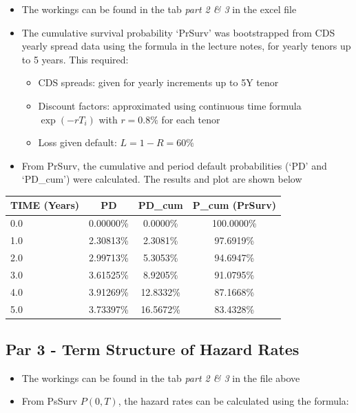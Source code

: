 \documentclass{article}
\providecommand{\tightlist}{%
      \setlength{\itemsep}{0pt}\setlength{\parskip}{0pt}}
\begin{document}
\begin{itemize}
\item
  The workings can be found in the tab \emph{part 2 \& 3} in the excel file
  
\item
  The cumulative survival probability `PrSurv' was bootstrapped from CDS
  yearly spread data using the formula in the lecture notes, for yearly
  tenors up to 5 years. This required:

  \begin{itemize}
  \tightlist
  \item
    CDS spreads: given for yearly increments up to 5Y tenor
  \item
    Discount factors: approximated using continuous time formula
    \(\exp(-rT_i)\) with \(r=0.8\%\) for each tenor
  \item
    Loss given default: \(L = 1- R = 60\%\)
  \end{itemize}
\item
  From PrSurv, the cumulative and period default probabilities (`PD' and `PD\_cum') were
  calculated. The results and plot are shown below
\end{itemize}

    \begin{longtable}[c]{@{}lccc@{}}
\toprule
TIME (Years) & PD & PD\_cum & P\_cum (PrSurv) \tabularnewline
\midrule
\endhead
0.0 & 0.00000\% & 0.0000\% & 100.0000\%\tabularnewline
1.0 & 2.30813\% & 2.3081\% & 97.6919\%\tabularnewline
2.0 & 2.99713\% & 5.3053\% & 94.6947\%\tabularnewline
3.0 & 3.61525\% & 8.9205\% & 91.0795\%\tabularnewline
4.0 & 3.91269\% & 12.8332\% & 87.1668\%\tabularnewline
5.0 & 3.73397\% & 16.5672\% & 83.4328\%\tabularnewline
\bottomrule
\end{longtable}

    \begin{figure}[htbp]
\centering
\caption{}
\end{figure}

    \subsection{Par 3 - Term Structure of Hazard
Rates}\label{par-3---term-structure-of-hazard-rates}

\begin{itemize}
\item
  The workings can be found in the tab \emph{part 2 \& 3} in the file
  above
\item
  From PsSurv \(P(0, T)\), the hazard rates can be calculated using the
  formula:
\end{itemize}
\end{document}
